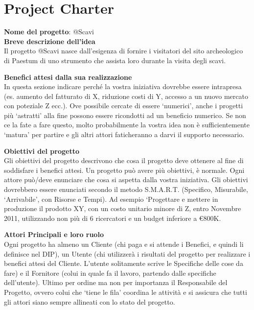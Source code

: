 
\chapter{Project Charter}
\label{appendiceA}


\textbf{Nome del progetto}: @Scavi\\

\textbf{Breve descrizione dell’idea}\\
Il progetto @Scavi nasce dall'esigenza di fornire i visitatori del sito archeologico di Paestum di uno strumento che assista loro durante la visita degli scavi.
 
\textbf{Benefici attesi dalla sua realizzazione}\\
In questa sezione indicare perché la vostra iniziativa dovrebbe essere intrapresa (es. aumento del fatturato di X, riduzione costi di Y, accesso a un nuovo mercato con poteziale Z ecc.). Ove possibile cercate di essere ‘numerici’, anche i progetti più ‘astratti’ alla fine possono essere ricondotti ad un beneficio numerico. Se non ce la fate a fare questo, molto probabilmente la vostra idea non è sufficientemente ‘matura’ per partire e gli altri attori faticheranno a darvi il supporto necessario.

\textbf{Obiettivi del progetto}\\
Gli obiettivi del progetto descrivono che cosa il progetto deve ottenere al fine di soddisfare i benefici attesi. Un progetto può avere più obiettivi, è normale. Ogni attore può/deve enunciare che cosa si aspetta dalla vostra iniziativa. Gli obiettivi dovrebbero essere enunciati secondo il metodo S.M.A.R.T. (Specifico, Misurabile, ‘Arrivabile’, con Risorse e Tempi). Ad esempio ‘Progettare e mettere in produzione il prodotto XY, con un costo unitario minore di Z, entro Novembre 2011, utilizzando non più di 6 ricercatori e un budget inferiore a €800K.

\textbf{Attori Principali e loro ruolo}\\
Ogni progetto ha almeno un Cliente (chi paga e si attende i Benefici, e quindi li definisce nel DIP), un Utente (chi utilizzerà i risultati del progetto per realizzare i benefici attesi del Cliente. L’utente solitamente scrive le Specifiche delle cose da fare) e il Fornitore (colui in quale fa il lavoro, partendo dalle specifiche dell’utente). Ultimo per ordine ma non per importanza il Responsabile del Progetto, ovvero colui che ‘tiene le fila’ coordina le attività e si assicura che tutti gli attori siano sempre allineati con lo stato del progetto.


